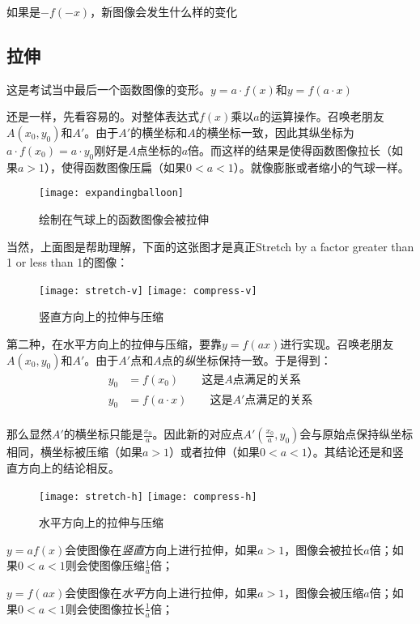 \begin{TaskBox}
如果是$-f(-x)$，新图像会发生什么样的变化
\end{TaskBox}

\subsection*{拉伸}
\label{subsec:Stretch}
这是考试当中最后一个函数图像的变形。$y=a\cdot f(x)$和$y=f(a\cdot x)$

还是一样，先看容易的。对整体表达式$f(x)$乘以$a$的运算操作。召唤老朋友$A(x_0,y_0)$和$A'$。由于$A'$的横坐标和$A$的横坐标一致，因此其纵坐标为$a\cdot f(x_0)=a\cdot y_0$刚好是$A$点坐标的$a$倍。而这样的结果是使得函数图像拉长（如果$a>1$），使得函数图像压扁（如果$0<a<1$）。就像膨胀或者缩小的气球一样。
\begin{figure}[H]
\centering
\texttt{[image: expandingballoon]}
\caption{绘制在气球上的函数图像会被拉伸}
\end{figure}

当然，上面图是帮助理解，下面的这张图才是真正Stretch by a factor greater than 1 or less than 1的图像：
\begin{figure}[H]
\centering
\texttt{[image: stretch-v]}
\texttt{[image: compress-v]}
\caption{竖直方向上的拉伸与压缩} %
\end{figure}


第二种，在水平方向上的拉伸与压缩，要靠$y=f(ax)$进行实现。召唤老朋友$A(x_0,y_0)$和$A'$。由于$A'$点和$A$点的\emph{纵}坐标保持一致。于是得到：
\begin{align*}
y_0 &= f(x_0) \qquad \text{这是}A\text{点满足的关系}\\
y_0 &= f(a\cdot x) \qquad \text{这是}A'\text{点满足的关系}\\
\end{align*}

那么显然$A'$的横坐标只能是$\frac{x_0}{a}$。因此新的对应点$A'(\frac{x_0}{a}, y_0)$会与原始点保持纵坐标相同，横坐标被压缩（如果$a>1$）或者拉伸（如果$0<a<1$）。其结论还是和竖直方向上的结论相反。
\begin{figure}[H]
\centering
\texttt{[image: stretch-h]}
\texttt{[image: compress-h]}
\caption{水平方向上的拉伸与压缩} %
\end{figure}

\begin{SummBox}
$y=af(x)$会使图像在\emph{竖直}方向上进行拉伸，如果$a>1$，图像会被拉长$a$倍；如果$0<a<1$则会使图像压缩$\frac{1}{a}$倍；

$y=f(ax)$会使图像在\emph{水平}方向上进行拉伸，如果$a>1$，图像会被压缩$a$倍；如果$0<a<1$则会使图像拉长$\frac{1}{a}$倍；
\end{SummBox}


